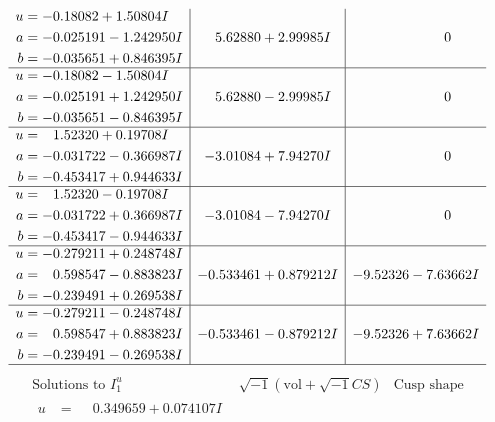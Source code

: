 \documentclass[1p]{elsarticle_modified}
\theoremstyle{definition}
\newcommand{\I}{\sqrt{-1}}
\begin{document}
$$\begin{array}{c|c|c}
\begin{aligned}
u &= -0.18082 + 1.50804 I \\
a &= -0.025191 - 1.242950 I \\
b &= -0.035651 + 0.846395 I\end{aligned}
 & \phantom{-}5.62880 + 2.99985 I & \phantom{-0.000000 } 0 \\ \hline\begin{aligned}
u &= -0.18082 - 1.50804 I \\
a &= -0.025191 + 1.242950 I \\
b &= -0.035651 - 0.846395 I\end{aligned}
 & \phantom{-}5.62880 - 2.99985 I & \phantom{-0.000000 } 0 \\ \hline\begin{aligned}
u &= \phantom{-}1.52320 + 0.19708 I \\
a &= -0.031722 - 0.366987 I \\
b &= -0.453417 + 0.944633 I\end{aligned}
 & -3.01084 + 7.94270 I & \phantom{-0.000000 } 0 \\ \hline\begin{aligned}
u &= \phantom{-}1.52320 - 0.19708 I \\
a &= -0.031722 + 0.366987 I \\
b &= -0.453417 - 0.944633 I\end{aligned}
 & -3.01084 - 7.94270 I & \phantom{-0.000000 } 0 \\ \hline\begin{aligned}
u &= -0.279211 + 0.248748 I \\
a &= \phantom{-}0.598547 - 0.883823 I \\
b &= -0.239491 + 0.269538 I\end{aligned}
 & -0.533461 + 0.879212 I & -9.52326 - 7.63662 I \\ \hline\begin{aligned}
u &= -0.279211 - 0.248748 I \\
a &= \phantom{-}0.598547 + 0.883823 I \\
b &= -0.239491 - 0.269538 I\end{aligned}
 & -0.533461 - 0.879212 I & -9.52326 + 7.63662 I\\
 \hline 
 \end{array}$$\newpage$$\begin{array}{c|c|c}  
\text{Solutions to }I^u_{1}& \I (\text{vol} + \sqrt{-1}CS) & \text{Cusp shape}\\
 \hline 
\begin{aligned}
u &= \phantom{-}0.349659 + 0.074107 I \\

\end{aligned}
\end{array}$$
\end{document}
